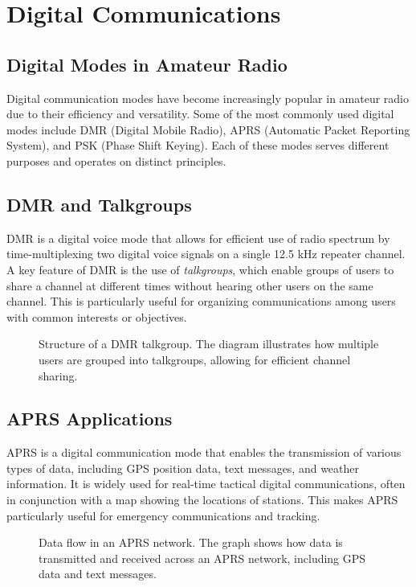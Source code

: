 \section{Digital Communications}
\label{section:digital_communications}

\subsection*{Digital Modes in Amateur Radio}
Digital communication modes have become increasingly popular in amateur radio due to their efficiency and versatility. Some of the most commonly used digital modes include DMR (Digital Mobile Radio), APRS (Automatic Packet Reporting System), and PSK (Phase Shift Keying). Each of these modes serves different purposes and operates on distinct principles.

\subsection*{DMR and Talkgroups}
DMR is a digital voice mode that allows for efficient use of radio spectrum by time-multiplexing two digital voice signals on a single 12.5 kHz repeater channel. A key feature of DMR is the use of \textit{talkgroups}, which enable groups of users to share a channel at different times without hearing other users on the same channel. This is particularly useful for organizing communications among users with common interests or objectives.

\begin{figure}[h]
    \centering
    \caption{Structure of a DMR talkgroup. The diagram illustrates how multiple users are grouped into talkgroups, allowing for efficient channel sharing.}
    \label{fig:dmr_talkgroup}
\end{figure}

\subsection*{APRS Applications}
APRS is a digital communication mode that enables the transmission of various types of data, including GPS position data, text messages, and weather information. It is widely used for real-time tactical digital communications, often in conjunction with a map showing the locations of stations. This makes APRS particularly useful for emergency communications and tracking.

\begin{figure}[h]
    \centering
    \caption{Data flow in an APRS network. The graph shows how data is transmitted and received across an APRS network, including GPS data and text messages.}
    \label{fig:aprs_flow}
\end{figure}

